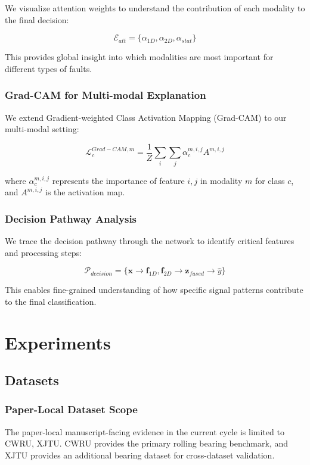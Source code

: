 \documentclass[journal]{IEEEtran}
\begin{document}
We visualize attention weights to understand the contribution of each modality to the final decision:

\begin{equation}
\mathcal{E}_{att} = \{\alpha_{1D}, \alpha_{2D}, \alpha_{stat}\}
\end{equation}

This provides global insight into which modalities are most important for different types of faults.

\subsubsection{Grad-CAM for Multi-modal Explanation}

We extend Gradient-weighted Class Activation Mapping (Grad-CAM) to our multi-modal setting:

\begin{equation}
\mathcal{L}_{c}^{Grad-CAM,m} = \frac{1}{Z} \sum_i \sum_j \alpha_{c}^{m,i,j} A^{m,i,j}
\end{equation}

where $\alpha_{c}^{m,i,j}$ represents the importance of feature $i,j$ in modality $m$ for class $c$, and $A^{m,i,j}$ is the activation map.

\subsubsection{Decision Pathway Analysis}

We trace the decision pathway through the network to identify critical features and processing steps:

\begin{equation}
\mathcal{P}_{decision} = \{\mathbf{x} \rightarrow \mathbf{f}_{1D}, \mathbf{f}_{2D} \rightarrow \mathbf{z}_{fused} \rightarrow \hat{y}\}
\end{equation}

This enables fine-grained understanding of how specific signal patterns contribute to the final classification.

\section{Experiments}

\subsection{Datasets}

\subsubsection{Paper-Local Dataset Scope}
The paper-local manuscript-facing evidence in the current cycle is limited to CWRU, XJTU. CWRU provides the primary rolling bearing benchmark, and XJTU provides an additional bearing dataset for cross-dataset validation.
\end{document}
